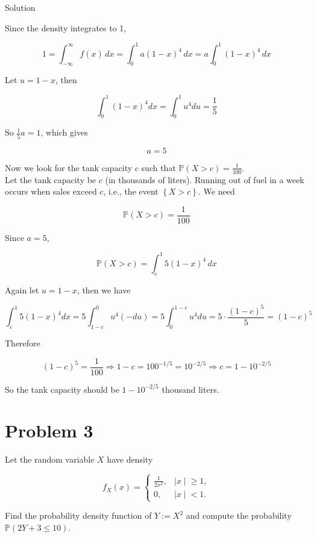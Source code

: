 \documentclass{qlnotes-export}
\begin{document}
\begin{qlsolution}{Solution}

Since the density integrates to 1,

\[1 = \int_{- \infty}^{\infty}f(x)\, dx = \int_{0}^{1}a(1 - x)^{4}\, dx = a\int_{0}^{1}(1 - x)^{4}\, dx\]

Let \(u = 1 - x\), then

\[\int_{0}^{1}(1 - x)^{4}dx = \int_{0}^{1}u^{4}du = \frac{1}{5}\]

So \(\frac{1}{5}a = 1\), which gives

\[a = 5\]

Now we look for the tank capacity \(c\) such that \({\mathbb{P}}(X > c) = \frac{1}{100}\).\\
Let the tank capacity be \(c\) (in thousands of liters). Running out of fuel in a week occurs when sales exceed \(c\), i.e., the event \(\left\{ {X > c} \right\}\). We need

\[{\mathbb{P}}(X > c) = \frac{1}{100}\]

Since \(a = 5\),

\[{\mathbb{P}}(X > c) = \int_{c}^{1}5(1 - x)^{4}\, dx\]

Again let \(u = 1 - x\), then we have

\[\int_{c}^{1}5(1 - x)^{4}dx = 5\int_{1 - c}^{0}u^{4}( - du) = 5\int_{0}^{1 - c}u^{4}du = 5 \cdot \frac{(1 - c)^{5}}{5} = (1 - c)^{5}\]

Therefore

\[(1 - c)^{5} = \frac{1}{100}\Longrightarrow 1 - c = 100^{- 1/5} = 10^{- 2/5}\Longrightarrow c = 1 - 10^{- 2/5}\]

So the tank capacity should be \(1 - 10^{- 2/5}\) thousand liters.

\end{qlsolution}

\section{Problem 3}\label{problem-3-2}

Let the random variable \(X\) have density

\[f_{X}(x) = \left\{ \begin{matrix}
{\frac{1}{2x^{2}},} & \left. |x \middle| \geq 1, \right. \\
{0,} & \left. |x \middle| < 1. \right.
\end{matrix} \right.\]

Find the probability density function of \(Y := X^{2}\) and compute the probability \({\mathbb{P}}(2Y + 3 \leq 10)\).
\end{document}
